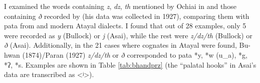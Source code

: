 I examined the words containing \textit{z}, \textit{dz}, \textit{th} mentioned by Ochiai in \textcite{bullock1874formosan} and those containing \textit{ð} recorded by \textcite{asai1953sedik} (his data was collected in 1927), comparing them with \acl{pata} from \textcite{goderich2020phd} and modern Atayal dialects. I found that out of 28 examples, only 5 were recorded as \textit{y} (Bullock) or \textit{j} (Asai), while the rest were \textit{z/dz/th} (Bullock) or \textit{ð} (Asai). Additionally, in the 21 cases where cognates in Atayal were found, Bu-hwan (1874)/Paran (1927) \textit{z/dz/th} or \textit{ð} corresponded to \acl{pata} *y, *w (u\_a), *g, *ʔ, *s. Examples are shown in Table \ref{tab:bhandprz} (the ``palatal hooks'' in Asai's data are transcribed as <ʲ>).

